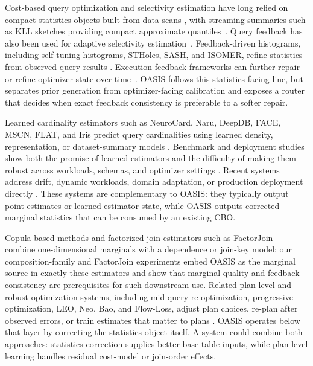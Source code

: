 \documentclass[preprint,12pt]{elsarticle}
\begin{document}
Cost-based query optimization and selectivity estimation have long relied on
compact statistics objects built from data scans
\cite{selinger1979access,chaudhuri1998overview,ioannidis1993histogram,poosala1997selectivity},
with streaming summaries such as KLL sketches providing compact approximate
quantiles~\cite{ivkin2019kll}. Query feedback has also been used for adaptive
selectivity estimation~\cite{chen1994adaptive}. Feedback-driven histograms,
including self-tuning histograms, STHoles, SASH, and ISOMER, refine statistics
from observed query results
\cite{aboulnaga1999self,bruno2001stholes,lim2003sash,markl2007consistent}.
Execution-feedback frameworks can further repair or refine optimizer state over
time~\cite{chaudhuri2008paygo}. OASIS follows this statistics-facing line, but
separates prior generation from optimizer-facing calibration and exposes a
router that decides when exact feedback consistency is preferable to a softer
repair.

Learned cardinality estimators such as NeuroCard, Naru, DeepDB, FACE, MSCN,
FLAT, and Iris predict query cardinalities using learned density,
representation, or dataset-summary models
\cite{yang2020neurocard,yang2019deep,hilprecht2019deepdb,yang2020face,kipf2019learned,zhu2021flat,lu2022pretraining}.
Benchmark and deployment studies show both the promise of learned estimators and
the difficulty of making them robust across workloads, schemas, and optimizer
settings
\cite{wang2021ready,sun2021designspace,kim2022learnedstudy,han2021cardinality}.
Recent systems address drift, dynamic workloads, domain adaptation, or
production deployment directly
\cite{li2022warper,negi2023robust,li2023alece,wang2023ceda,wang2023ldss,han2024bytecard}.
These systems are complementary to OASIS: they typically output point estimates
or learned estimator state, while OASIS outputs corrected marginal statistics
that can be consumed by an existing CBO.

Copula-based methods and factorized join estimators such as
FactorJoin~\cite{wu2023factorjoin} combine one-dimensional marginals with a
dependence or join-key model; our composition-family and FactorJoin experiments
embed OASIS as the marginal source in exactly these estimators and show that
marginal quality and feedback consistency are prerequisites for such downstream
use. Related plan-level and robust optimization systems, including mid-query
re-optimization, progressive optimization, LEO, Neo, Bao, and Flow-Loss, adjust
plan choices, re-plan after observed errors, or train estimates that matter to
plans
\cite{kabra1998efficient,markl2004progressive,babcock2005robust,stillger2001leo,marcus2019neo,marcus2022bao,negi2021flowloss,lee2023impact}.
OASIS operates below that layer by correcting the statistics object itself. A
system could combine both approaches: statistics correction supplies better
base-table inputs, while plan-level learning handles residual cost-model or
join-order effects.
\end{document}
